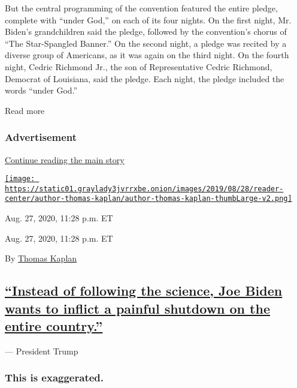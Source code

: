 But the central programming of the convention featured the entire
pledge, complete with ``under God,'' on each of its four nights. On the
first night, Mr. Biden's grandchildren said the pledge, followed by the
convention's chorus of ``The Star-Spangled Banner.'' On the second
night, a pledge was recited by a diverse group of Americans, as it was
again on the third night. On the fourth night, Cedric Richmond Jr., the
son of Representative Cedric Richmond, Democrat of Louisiana, said the
pledge. Each night, the pledge included the words ``under God.''

Read more

\hypertarget{advertisement-2}{%
\subsubsection{Advertisement}\label{advertisement-2}}

\protect\hyperlink{after-dfp-ad-mid3}{Continue reading the main story}

\href{https://www.nytimes3xbfgragh.onion/by/thomas-kaplan}{\texttt{[image: https://static01.graylady3jvrrxbe.onion/images/2019/08/28/reader-center/author-thomas-kaplan/author-thomas-kaplan-thumbLarge-v2.png]}}

Aug. 27, 2020, 11:28 p.m. ET

Aug. 27, 2020, 11:28 p.m. ET

By \href{https://www.nytimes3xbfgragh.onion/by/thomas-kaplan}{Thomas
Kaplan}

\hypertarget{instead-of-following-the-science-joe-biden-wants-to-inflict-a-painful-shutdown-on-the-entire-country}{%
\subsection{\texorpdfstring{\protect\hyperlink{instead-of-following-the-science-joe-biden-wants-to-inflict-a-painful-shutdown-on-the-entire-country}{``Instead
of following the science, Joe Biden wants to inflict a painful shutdown
on the entire
country.''}}{``Instead of following the science, Joe Biden wants to inflict a painful shutdown on the entire country.''}}\label{instead-of-following-the-science-joe-biden-wants-to-inflict-a-painful-shutdown-on-the-entire-country}}

--- President Trump

\hypertarget{this-is-exaggerated}{%
\subsubsection{This is exaggerated.}\label{this-is-exaggerated}}

